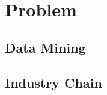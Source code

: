 \section{Problem} %
\label{sec:problem}
\subsection{Data Mining} %
\label{sub:data_mining}


\subsection{Industry Chain} %
\label{sub:industry_chain}

